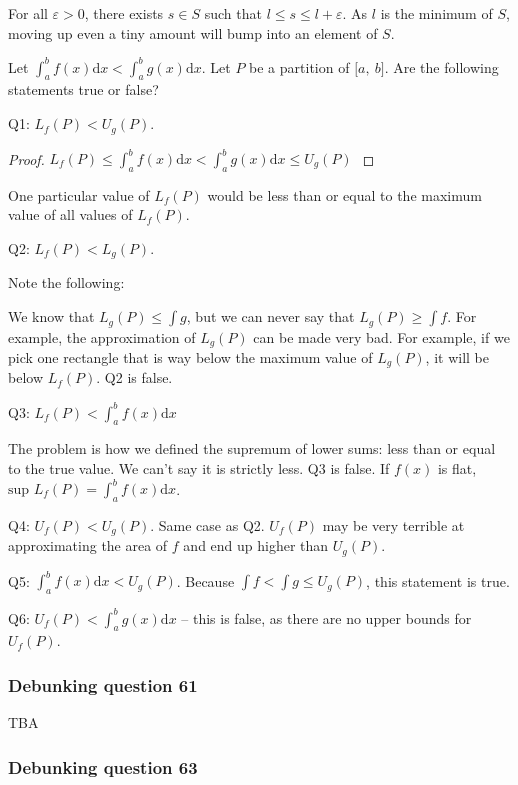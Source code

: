 \documentclass[12pt]{article}
\theoremstyle{plain}
\theoremstyle{remark}
\theoremstyle{definition}
\begin{document}
For all \(\varepsilon > 0\), there exists \(s \in S\) such that
\(l \leq s \leq l + \varepsilon\). As \(l\) is the minimum of \(S\),
moving up even a tiny amount will bump into an element of \(S\).

Let \(\int_{a}^{b}{f(x)\text{d}x} < \int_{a}^{b}{g(x)\text{d}x}\). Let
\(P\) be a partition of \(\lbrack a,\ b\rbrack\). Are the following
statements true or false?

Q1: \(L_{f}(P) < U_{g}(P)\).

\begin{proof}
\(L_{f}(P) \leq \int_{a}^{b}{f(x)\text{d}x} < \int_{a}^{b}{g(x)\text{d}x} \leq U_{g}(P)\ \)
\end{proof}

One particular value of \(L_{f}(P)\) would be less than or equal to the
maximum value of all values of \(L_{f}(P)\).

Q2: \(L_{f}(P) < L_{g}(P)\).

Note the following:


We know that \(L_{g}(P) \leq \int g\), but we can never say that
\(L_{g}(P) \geq \int f\). For example, the approximation of \(L_{g}(P)\)
can be made very bad. For example, if we pick one rectangle that is way
below the maximum value of \(L_{g}(P)\), it will be below \(L_{f}(P)\).
Q2 is false.

Q3: \(L_{f}(P) < \int_{a}^{b}{f(x)\text{d}x}\)

The problem is how we defined the supremum of lower sums: less than or
equal to the true value. We can't say it is strictly less. Q3 is false.
If \(f(x)\) is flat,
\(\text{sup\ }L_{f}(P) = \int_{a}^{b}{f(x)\text{d}x}\).

Q4: \(U_{f}(P) < U_{g}(P)\). Same case as Q2. \(U_{f}(P)\) may be very
terrible at approximating the area of \(f\) and end up higher than
\(U_{g}(P)\).

Q5: \(\int_{a}^{b}{f(x)\text{d}x} < U_{g}(P)\). Because
\(\int f < \int g \leq U_{g}(P)\), this statement is true.

Q6: \(U_{f}(P) < \int_{a}^{b}{g(x)\text{d}x}\) -- this is false, as
there are no upper bounds for \(U_{f}(P)\).


\subsubsection{Debunking question 61}

TBA


\subsubsection{Debunking question 63}
\end{document}
